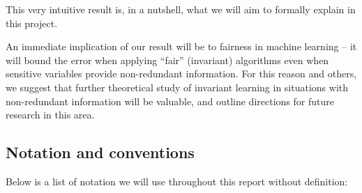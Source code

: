 \documentclass[12pt]{article}
\newtheorem{qn}[thm]{Question}
\theoremstyle{definition}
\numberwithin{equation}{section}
\numberwithin{figure}{section}
\numberwithin{table}{section}
\begin{document}
This very intuitive result is, in a nutshell, what we will aim to formally explain in this project.

An immediate implication of our result will be to fairness in machine learning -- it will bound the error when applying ``fair'' (invariant) algorithms even when sensitive variables provide non-redundant information. For this reason and others, we suggest that further theoretical study of invariant learning in situations with non-redundant information will be valuable, and outline directions for future research in this area.



\subsection{Notation and conventions}

Below is a list of notation we will use throughout this report without definition:
\end{document}
